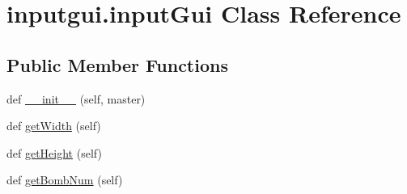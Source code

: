 \hypertarget{classinputgui_1_1input_gui}{}\section{inputgui.\+input\+Gui Class Reference}
\label{classinputgui_1_1input_gui}
\subsection*{Public Member Functions}
\begin{DoxyCompactItemize}
\item 
def \mbox{\hyperlink{classinputgui_1_1input_gui_af9af6444741570b26c7f419d11c6e823}{\+\_\+\+\_\+init\+\_\+\+\_\+}} (self, master)
\item 
def \mbox{\hyperlink{classinputgui_1_1input_gui_acb2f03dc243b615d56b85025e72fe83d}{get\+Width}} (self)
\item 
def \mbox{\hyperlink{classinputgui_1_1input_gui_a0f58dcdd5da2004e96ce2e846aa8d70b}{get\+Height}} (self)
\item 
def \mbox{\hyperlink{classinputgui_1_1input_gui_ad092a378c7af02c7bef4055297ad10d0}{get\+Bomb\+Num}} (self)
\end{DoxyCompactItemize}
